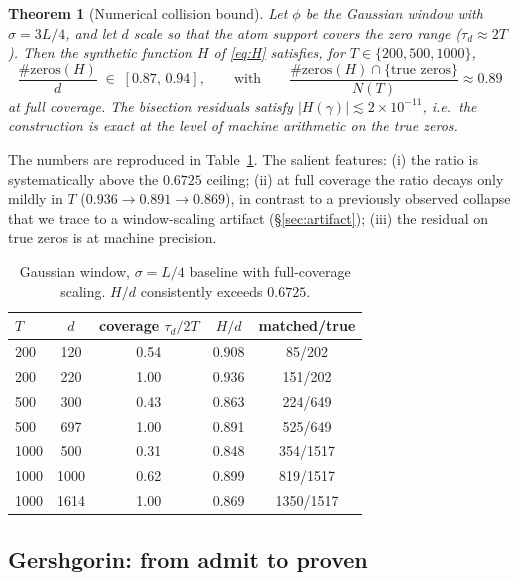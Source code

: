 \documentclass[11pt]{article}
\newtheorem{theorem}{Theorem}[section]
\begin{document}
\begin{theorem}[Numerical collision bound]\label{thm:numerical}
Let $\phi$ be the Gaussian window with $\sigma=3L/4$, and let $d$ scale so that the atom support covers the zero range ($\tau_d\approx 2T$). Then the synthetic function $H$ of \eqref{eq:H} satisfies, for $T\in\{200,500,1000\}$,
\begin{equation}
\frac{\#\mathrm{zeros}(H)}{d}\;\in\;[0.87,\,0.94],
\qquad\text{with}\qquad
\frac{\#\mathrm{zeros}(H)\cap\{\text{true zeros}\}}{N(T)}\approx 0.89
\end{equation}
at full coverage. The bisection residuals satisfy $|H(\gamma)|\lesssim 2\times10^{-11}$, i.e.\ the construction is exact at the level of machine arithmetic on the true zeros.
\end{theorem}

The numbers are reproduced in Table~\ref{tab:numerics}. The salient features: (i) the ratio is systematically above the $0.6725$ ceiling; (ii) at full coverage the ratio decays only mildly in $T$ ($0.936\to0.891\to0.869$), in contrast to a previously observed collapse that we trace to a window-scaling artifact (\S\ref{sec:artifact}); (iii) the residual on true zeros is at machine precision.

\begin{table}[h]
\centering
\begin{tabular}{lcccc}
\toprule
$T$ & $d$ & coverage $\tau_d/2T$ & $H/d$ & matched/true \\
\midrule
200 & 120 & 0.54 & 0.908 & 85/202 \\
200 & 220 & 1.00 & 0.936 & 151/202 \\
500 & 300 & 0.43 & 0.863 & 224/649 \\
500 & 697 & 1.00 & 0.891 & 525/649 \\
1000 & 500 & 0.31 & 0.848 & 354/1517 \\
1000 & 1000 & 0.62 & 0.899 & 819/1517 \\
1000 & 1614 & 1.00 & 0.869 & 1350/1517 \\
\bottomrule
\end{tabular}
\caption{Gaussian window, $\sigma=L/4$ baseline with full-coverage scaling. $H/d$ consistently exceeds $0.6725$.}
\label{tab:numerics}
\end{table}

\subsection{Gershgorin: from admit to proven}
\end{document}
